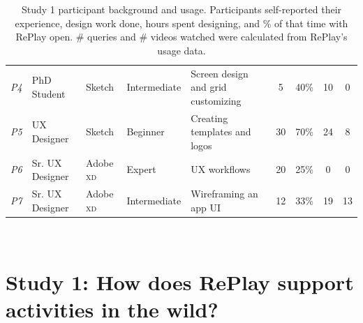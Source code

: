 \begin{table}[b]
{\begin{tabular}{lllllcccc}
\textit{P4}          & PhD Student              & Sketch                & Intermediate  & Screen design and grid customizing                                           & 5                                                                             & 40\%                                                                                            & 10                   & 0                                                                                         \\
\textit{P5}          & UX Designer              & Sketch                & Beginner      & Creating templates and logos                                                 & 30                                                                            & 70\%                                                                                           & 24                   & 8                                                                                         \\
\textit{P6}          & Sr. UX Designer       & Adobe \textsc{xd}     & Expert        & UX workflows                                                                 & 20                                                                            & 25\%                                                                                            & \phantom{0}0                    & 0                                                                                         \\
\textit{P7}          & Sr. UX Designer       & Adobe \textsc{xd}     & Intermediate  & Wireframing an app UI                                                        & 12                                                                            & 33\%                                                                                            & 19                   & 13\phantom{0}                                                                                       
\end{tabular}
}
\caption{Study 1 participant background and usage. Participants self-reported their experience, design work done, hours spent designing, and \% of that time with RePlay open. \# queries and \# videos watched were calculated from RePlay's usage data. }~\label{table:study1_usage}
\vspace{-0.2in}
\end{table}


\section{Study 1: How does RePlay support activities in the wild?}

